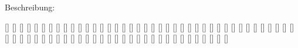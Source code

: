 \documentclass{m5figur-mv}[2018/06/10]
\begin{document}
{\begin{minipage}{\Halbseitenbreite}%
Beschreibung:
\end{minipage}
\begin{minipage}{\Halbseitenbreite}%
\end{minipage}%
\clearpage




}%


{%


\UngelerntOhne


[]{}
[]{}
[]{}
[]{}
[]{}
[]{}
[]{}
[]{}
[]{}
[]{}
[]{}
[]{}
[]{}
[]{}
[]{}
[]{}
[]{}
[]{}
[]{}
[]{}
[]{}
[]{}
[]{}
[]{}
[]{}
[]{}
[]{}
[]{}
[]{}
[]{}
[]{}
[]{}
[]{}
[]{}
[]{}
[]{}
[]{}
[]{}
[]{}
[]{}
[]{}
[]{}
[]{}
[]{}
[]{}
[]{}
[]{}
[]{}
[]{}
[]{}
[]{}
[]{}
[]{}
[]{}
[]{}
[]{}
[]{}
[]{}
[]{}
[]{}
[]{}
[]{}
[]{}
[]{}
[]{}
[]{}
[]{}
[]{}
[]{}
[]{}
[]{}

}
\end{document}
